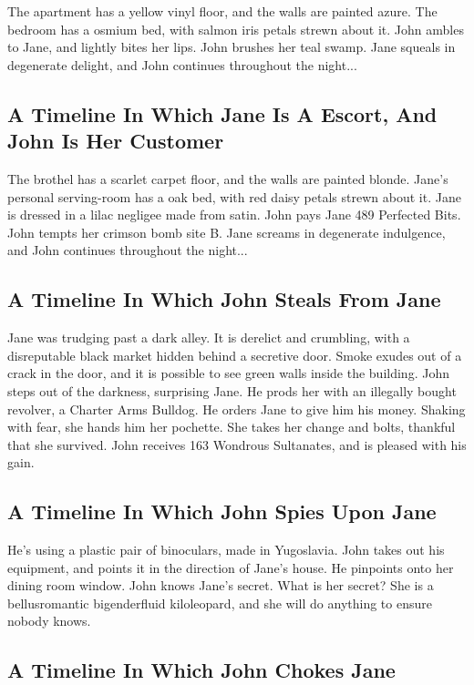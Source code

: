 \documentclass{article}
\begin{document}
The apartment has a yellow vinyl floor, and the walls are painted azure.
The bedroom has a osmium bed, with salmon iris petals strewn about it.
John ambles to Jane, and lightly bites her lips.
John brushes her teal swamp.
Jane squeals in degenerate delight, and John continues throughout the night...
\subsection{A Timeline In Which Jane Is A Escort, And John Is Her Customer}


The brothel has a scarlet carpet floor, and the walls are painted blonde.
Jane's personal serving{-}room has a oak bed, with red daisy petals strewn about it.
Jane is dressed in a lilac negligee made from satin.
John pays Jane 489 Perfected Bits.
John tempts her crimson bomb site B.
Jane screams in degenerate indulgence, and John continues throughout the night...
\subsection{A Timeline In Which John Steals From Jane}


Jane was trudging past a dark alley.
It is derelict and crumbling, with a disreputable black market hidden behind a secretive door.
Smoke exudes out of a crack in the door, and it is possible to see green walls inside the building.
John steps out of the darkness, surprising Jane.
He prods her with an illegally bought revolver, a Charter Arms Bulldog.
He orders Jane to give him his money.
Shaking with fear, she hands him her pochette.
She takes her change and bolts, thankful that she survived.
John receives 163 Wondrous Sultanates, and is pleased with his gain.
\subsection{A Timeline In Which John Spies Upon Jane}


He's using a plastic pair of binoculars, made in Yugoslavia.
John takes out his equipment, and points it in the direction of Jane's house. He pinpoints onto her dining room window.
John knows Jane's secret. What is her secret? She is a bellusromantic bigenderfluid kiloleopard, and she will do anything to ensure nobody knows.
\subsection{A Timeline In Which John Chokes Jane}
\end{document}
